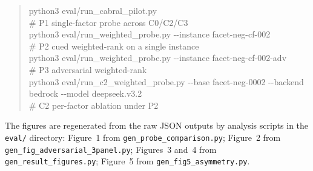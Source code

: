 \documentclass[11pt]{article}
\begin{document}
\begin{quote}\footnotesize\ttfamily
python3 eval/run\_cabral\_pilot.py\\
\quad\# P1 single-factor probe across C0/C2/C3\\
python3 eval/run\_weighted\_probe.py -{}-instance facet-neg-cf-002\\
\quad\# P2 cued weighted-rank on a single instance\\
python3 eval/run\_weighted\_probe.py -{}-instance facet-neg-cf-002-adv\\
\quad\# P3 adversarial weighted-rank\\
python3 eval/run\_c2\_weighted\_probe.py -{}-base facet-neg-0002 -{}-backend bedrock -{}-model deepseek.v3.2\\
\quad\# C2 per-factor ablation under P2
\end{quote}

The figures are regenerated from the raw JSON outputs by analysis scripts in the \texttt{eval/} directory: Figure~1 from \texttt{gen\_probe\_comparison.py}; Figure~2 from \texttt{gen\_fig\_adversarial\_3panel.py}; Figures~3 and~4 from \texttt{gen\_result\_figures.py}; Figure~5 from \texttt{gen\_fig5\_asymmetry.py}.
\end{document}
